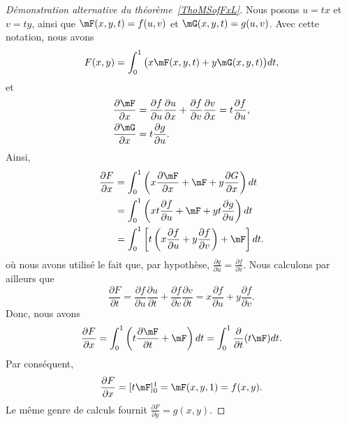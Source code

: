 \begin{proof}[Démonstration alternative du théorème~\ref{ThoMSofFxL}]
	Nous posons $u=tx$ et $v=ty$, ainsi que $\mF(x,y,t)=f(u,v)$ et $\mG(x,y,t)=g(u,v)$. Avec cette notation, nous avons
	\begin{equation}
		F(x,y)=\int_0^1\big( x\mF(x,y,t)+y\mG(x,y,t) \big)dt,
	\end{equation}
	et
	\begin{equation}
		\begin{aligned}[]
			\frac{ \partial \mF }{ \partial x } & =\frac{ \partial f }{ \partial u }\frac{ \partial u }{ \partial x }+\frac{ \partial f }{ \partial v }\frac{ \partial v }{ \partial x }=t\frac{ \partial f }{ \partial u }, \\
			\frac{ \partial \mG }{ \partial x } & =t\frac{ \partial g }{ \partial u }.
		\end{aligned}
	\end{equation}
	Ainsi,
	\begin{equation}
		\begin{aligned}[]
			\frac{ \partial F }{ \partial x } & =\int_0^1\left( x\frac{ \partial \mF }{ \partial x }+\mF+y\frac{ \partial G }{ \partial x } \right)dt                  \\
			                                  & =\int_0^1\left( xt\frac{ \partial f }{ \partial u } +\mF+yt\frac{ \partial g }{ \partial u } \right)dt                 \\
			                                  & =\int_0^1\left[  t\left( x\frac{ \partial f }{ \partial u }+y\frac{ \partial f }{ \partial v } \right)+\mF  \right]dt.
		\end{aligned}
	\end{equation}
	où nous avons utilisé le fait que, par hypothèse, $\frac{ \partial g }{ \partial u }=\frac{ \partial f }{ \partial v }$. Nous calculons par ailleurs que
	\begin{equation}
		\frac{ \partial F }{ \partial t }=\frac{ \partial f }{ \partial u }\frac{ \partial u }{ \partial t }+\frac{ \partial f }{ \partial v }\frac{ \partial v }{ \partial t }=x\frac{ \partial f }{ \partial u }+y\frac{ \partial f }{ \partial v }.
	\end{equation}
	Donc, nous avons
	\begin{equation}
		\frac{ \partial F }{ \partial x }=\int_0^1\left( t\frac{ \partial \mF }{ \partial t }+\mF \right)dt=\int_0^1\frac{ \partial  }{ \partial t }(t\mF)dt.
	\end{equation}
	Par conséquent,
	\begin{equation}
		\frac{ \partial F }{ \partial x }=[t\mF]_0^1=\mF(x,y,1)=f(x,y).
	\end{equation}
	Le même genre de calculs fournit $\frac{ \partial F }{ \partial y }=g(x,y)$.
\end{proof}

